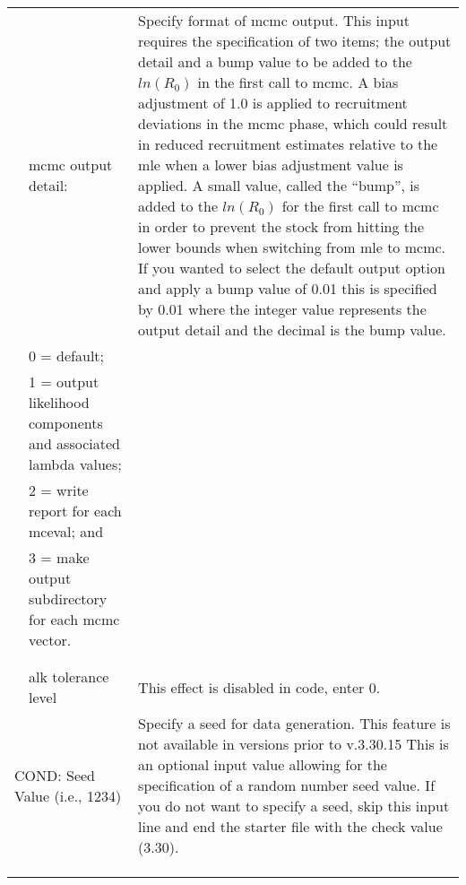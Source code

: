 {\begin{landscape}
\begin{longtable}{p{1.5cm} p{7.2cm} p{12.3cm}}
  \pagebreak
  0.01 & \gls{mcmc} output detail: & \multirow{1}{1cm}[-0.25cm]{\parbox{12.5cm}{Specify format of \gls{mcmc} output. This input requires the specification of two items; the output detail and a bump value to be added to the $ln(R_{0})$ in the first call to \gls{mcmc}. A bias adjustment of 1.0 is applied to recruitment deviations in the \gls{mcmc} phase, which could result in reduced recruitment estimates relative to the \gls{mle} when a lower bias adjustment value is applied. A small value, called the ``bump'', is added to the $ln(R_{0})$ for the first call to \gls{mcmc} in order to prevent the stock from hitting the lower bounds when switching from \gls{mle} to \gls{mcmc}. If you wanted to select the default output option and apply a bump value of 0.01 this is specified by 0.01 where the integer value represents the output detail and the decimal is the bump value.}} \Tstrut\Bstrut\\
  & 0 = default; & \\
  & 1 = output likelihood components and associated lambda values; & \\
  & 2 = write report for each mceval; and & \\		 
  & 3 = make output subdirectory for each \gls{mcmc} vector. & \Bstrut\\
  & & \\
  & & \Tstrut\Bstrut\\ 
  
  \hline
  \raisebox{0.1\ht\strutbox}{\hypertarget{ALK}{0}} & \gls{alk} tolerance level & This effect is disabled in code, enter 0. \Tstrut\Bstrut\\

  \hline  
  \multicolumn{2}{l}{COND: Seed Value (i.e., 1234)}& \multirow{1}{1cm}[-0.25cm]{\parbox{12.5cm}{Specify a seed for data generation. This feature is not available in versions prior to v.3.30.15 This is an optional input value allowing for the specification of a random number seed value. If you do not want to specify a seed, skip this input line and end the starter file with the check value (3.30).}} \Tstrut\Bstrut\\
  & & \\ 
  & & \Bstrut\\
  & & \\
  

\end{longtable}
\end{landscape}}
